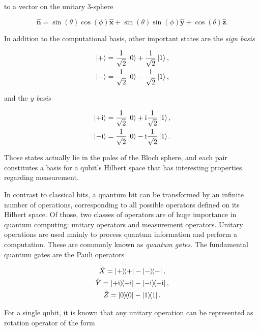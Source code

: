   \noindent to a vector on the unitary 3-sphere

  \begin{equation}
    \hat{\mathbf{n}} = \sin(\theta) \cos(\phi) \hat{\mathbf{x}}  + \sin(\theta) \sin(\phi)\hat{\mathbf{y}} + \cos(\theta) \hat{\mathbf{z}}.
    \label{eq:bloch-vector}
  \end{equation}

  In addition to the computational basis, other important states are the \textit{sign basis}

  \begin{gather}
    \ket{+} = \frac{1}{\sqrt{2}}\ket{0} + \frac{1}{\sqrt{2}}\ket{1}, \\
    \ket{-} = \frac{1}{\sqrt{2}}\ket{0} - \frac{1}{\sqrt{2}}\ket{1},
    \label{eq:sign-basis}
  \end{gather}

  \noindent and the \textit{y basis}

  \begin{gather}
    \ket{+\mathrm{i}} = \frac{1}{\sqrt{2}}\ket{0} + \mathrm{i}\frac{1}{\sqrt{2}}\ket{1}, \\
    \ket{-\mathrm{i}} = \frac{1}{\sqrt{2}}\ket{0} - \mathrm{i}\frac{1}{\sqrt{2}}\ket{1}.
    \label{eq:phase-basis}
  \end{gather}

  \noindent Those states actually lie in the poles of the Bloch sphere, and each pair constitutes a basis for a qubit's Hilbert space that has interesting properties regarding measurement.

  In contrast to classical bits, a quantum bit can be transformed by an infinite number of operations, corresponding to all possible operators defined on its Hilbert space. Of those, two classes of operators are of huge importance in quantum computing: unitary operators and measurement operators. Unitary operations are used mainly to process quantum information and perform a computation. These are commonly known as \textit{quantum gates}. The fundamental quantum gates are the Pauli operators

  \begin{gather}
    \hat{X} = \ketbra{+}{+} - \ketbra{-}{-}, \\
    \hat{Y} = \ketbra{+\mathrm{i}}{+\mathrm{i}} - \ketbra{-\mathrm{i}}{-\mathrm{i}}, \\
    \hat{Z} = \ketbra{0}{0} - \ketbra{1}{1}.
    \label{eq:pauli-ops}
  \end{gather}
  
  
  For a single qubit, it is known that any unitary operation can be represented as rotation operator of the form

